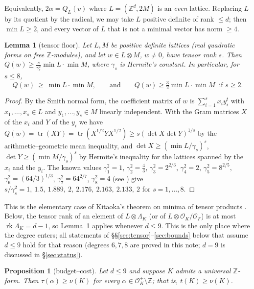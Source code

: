 \documentclass[11pt]{amsart}
\newtheorem{lemma}[theorem]{Lemma}
\newtheorem{proposition}[theorem]{Proposition}
\theoremstyle{definition}
\DeclareMathOperator{\rk}{rk}
\newcommand{\OK}{\mathcal{O}_K}
\newcommand{\OF}{\mathcal{O}_F}
\newcommand{\Z}{\mathbb{Z}}
\newcommand{\LamK}{\Lambda_K}
\begin{document}
Equivalently, $2\alpha=Q_{L}(v)$ where $L=(\Z^d,2M)$ is an \emph{even} lattice.  Replacing
$L$ by its quotient by the radical, we may take $L$ positive definite of rank $\le d$; then
$\min L\ge2$, and every vector of $L$ that is not a minimal vector has norm $\ge4$.

\begin{lemma}[tensor floor]\label{lem:tensor}
Let $L,M$ be positive definite lattices (real quadratic forms on free $\Z$-modules), and let
$w\in L\otimes M$, $w\ne0$, have tensor rank $s$.  Then
$Q(w)\ge\frac{s}{\gamma_s^2}\min L\cdot\min M$, where $\gamma_s$ is Hermite's constant.
In particular, for $s\le 8$,
\[
Q(w)\ \ge\ \min L\cdot\min M,\qquad\text{and}\qquad Q(w)\ge\tfrac32\min L\cdot\min M\ \text{ if } s\ge2 .
\]
\end{lemma}

\begin{proof}
By the Smith normal form, the coefficient matrix of $w$ is $\sum_{i=1}^s x_iy_i^t$ with
$x_1,\dots,x_s\in L$ and $y_1,\dots,y_s\in M$ linearly independent.  With the Gram
matrices $X$ of the $x_i$ and $Y$ of the $y_i$ we have $Q(w)=\operatorname{tr}(XY)
=\operatorname{tr}(X^{1/2}YX^{1/2})\ge s(\det X\det Y)^{1/s}$ by the arithmetic--geometric
mean inequality, and $\det X\ge(\min L/\gamma_s)^s$, $\det Y\ge(\min M/\gamma_s)^s$ by
Hermite's inequality for the lattices spanned by the $x_i$ and the $y_i$.  The known values
$\gamma_1^2=1$, $\gamma_2^2=\frac43$, $\gamma_3^2=2^{2/3}$, $\gamma_4^2=2$,
$\gamma_5^2=8^{2/5}$, $\gamma_6^2=(64/3)^{1/3}$, $\gamma_7^2=64^{2/7}$, $\gamma_8^2=4$ (see
\cite{CS}) give $s/\gamma_s^2=1,\ 1.5,\ 1.889,\ 2,\ 2.176,\ 2.163,\ 2.133,\ 2$ for
$s=1,\dots,8$.
\end{proof}

This is the elementary case of Kitaoka's theorem on minima of tensor products \cite{Ki}.
Below, the tensor rank of an element of $L\otimes\LamK$ (or of $L\otimes\OK/\OF$) is at most
$\rk\LamK=d-1$, so Lemma~\ref{lem:tensor} applies whenever $d\le9$.  This is the only place
where the degree enters; all statements of \S\S\ref{sec:tensor}--\ref{sec:bounds} below that
assume $d\le9$ hold for that reason (degrees $6,7,8$ are proved in this note; $d=9$ is
discussed in \S\ref{sec:status}).

\begin{proposition}[budget--cost]\label{prop:budget}
Let $d\le9$ and suppose $K$ admits a universal $\Z$-form.  Then $\tau(\alpha)\ge\nu(K)$ for
every $\alpha\in\OK^+\setminus\Z$; that is, $t(K)\ge\nu(K)$.
\end{proposition}
\end{document}
